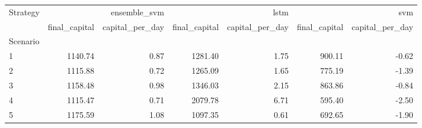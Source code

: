 \begin{tabular}{lrrrrrr}
\toprule
Strategy & \multicolumn{2}{r}{ensemble_svm} & \multicolumn{2}{r}{lstm} & \multicolumn{2}{r}{svm} \\
 & final_capital & capital_per_day & final_capital & capital_per_day & final_capital & capital_per_day \\
Scenario &  &  &  &  &  &  \\
\midrule
1 & 1140.74 & 0.87 & 1281.40 & 1.75 & 900.11 & -0.62 \\
2 & 1115.88 & 0.72 & 1265.09 & 1.65 & 775.19 & -1.39 \\
3 & 1158.48 & 0.98 & 1346.03 & 2.15 & 863.86 & -0.84 \\
4 & 1115.47 & 0.71 & 2079.78 & 6.71 & 595.40 & -2.50 \\
5 & 1175.59 & 1.08 & 1097.35 & 0.61 & 692.65 & -1.90 \\
\bottomrule
\end{tabular}
